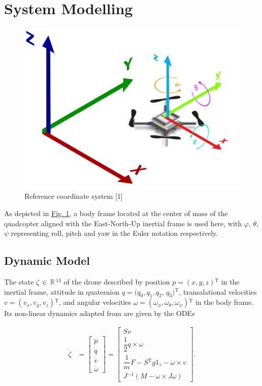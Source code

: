 \documentclass[conference]{IEEEtran}
\begin{document}
\section{System Modelling}\label{Section2}
\begin{figure}[htbp]
	\centerline{\includegraphics[scale = 0.4]{figures/ordinate.png} }
	\caption{Reference coordinate system [1]}
	\label{Fig1}
\end{figure}
As depicted in \hyperref[Fig1]{Fig. 1}, a body frame located at the center of mass of the quadcopter aligned with the East-North-Up inertial frame is used here, with $\varphi$, $\theta$, $\psi$ representing roll, pitch and yaw in the Euler notation respectively.

\subsection{Dynamic Model}
The state ${\zeta\,\in\,\mathbb{R}\,\mathrm{^{13}}}$ of the drone described by position ${p = (x, y, z)\mathrm{^{T}}}$ in the inertial frame, attitude in quaternion $q = (q_{0}, q_{1}, q_{2}$, $q_{3})\mathrm{^{T}}$, transalational velocities $v = (v_x, v_y, v_z)\mathrm{^{T}}$, and angular velocities $\omega = (\omega_{\phi}, \omega_{\theta}, \omega_{\psi})\mathrm{^{T}}$ in the body frame. Its non-linear dynamics adapted from \cite{carlos_efficient_2020} are given by the ODEs 

\begin{align}
\dot{\zeta} &= \begin{bmatrix}
	\dot{p} \\
	\dot{q}\\
	\dot{v}\\
	\dot{\omega}
\end{bmatrix} =
\begin{bmatrix}
    Sv \\
    \dfrac{1}{2}q\times \omega\\
    \dfrac{1}{m}F - S\mathrm{^{T}}g1_z - \omega \times v\\ 
    J\mathrm{^{-1}}(M - \omega \times J \omega)
\end{bmatrix}.
\end{align}
\end{document}
